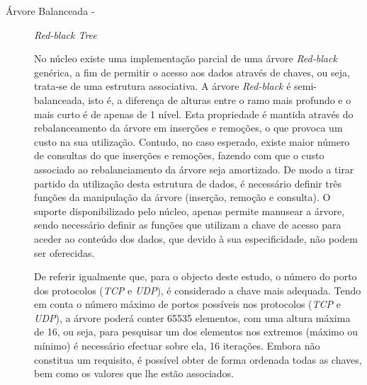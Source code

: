 \begin{description}


\item[Árvore Balanceada - ] \textit{Red-black Tree} 

No núcleo existe uma implementação parcial de uma árvore \textit{Red-black} genérica, a fim de permitir o acesso aos dados através de chaves, ou seja, trata-se de uma estrutura associativa.
A árvore \textit{Red-black} é semi-balanceada, isto é, a diferença de alturas entre o ramo mais profundo e o mais curto é de apenas de 1 nível.
Esta propriedade é mantida através do rebalanceamento da árvore em inserções e remoções, o que provoca um custo na sua utilização.
Contudo, no caso esperado, existe maior número de consultas do que inserções e remoções, fazendo com que o custo associado ao rebalanciamento da árvore seja amortizado.
De modo a tirar partido da utilização desta estrutura de dados, é necessário definir três funções da manipulação da árvore (inserção, remoção e consulta).
O suporte disponibilizado pelo núcleo, apenas permite manusear a árvore, sendo necessário definir as funções que utilizam a chave de acesso para aceder ao conteúdo dos dados, que devido à sua especificidade, não podem ser oferecidas.

De referir igualmente que, para o objecto deste estudo, o número do porto dos protocolos (\textit{TCP} e \textit{UDP}), é considerado a chave mais adequada.
Tendo em conta o número máximo de portos possíveis nos protocolos (\textit{TCP} e \textit{UDP}), a árvore poderá conter 65535 elementos, com uma altura máxima de 16, ou seja, para pesquisar um dos elementos nos extremos (máximo ou mínimo) é necessário efectuar sobre ela, 16 iterações.
Embora não constitua um requisito, é possível obter de forma ordenada todas as chaves, bem como os valores que lhe estão associados.


\end{description}
